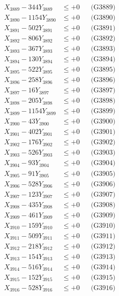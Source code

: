 \documentclass[a4paper,10pt]{article}
\begin{document}
{\begin{align}
X_{3889} - 344Y_{3889} &\leq +0 && \text{(G3889)} \\
X_{3890} - 1154Y_{3890} &\leq +0 && \text{(G3890)} \\
\allowbreak
X_{3891} - 502Y_{3891} &\leq +0 && \text{(G3891)} \\
X_{3892} - 806Y_{3892} &\leq +0 && \text{(G3892)} \\
X_{3893} - 367Y_{3893} &\leq +0 && \text{(G3893)} \\
X_{3894} - 130Y_{3894} &\leq +0 && \text{(G3894)} \\
X_{3895} - 522Y_{3895} &\leq +0 && \text{(G3895)} \\
X_{3896} - 258Y_{3896} &\leq +0 && \text{(G3896)} \\
X_{3897} - 16Y_{3897} &\leq +0 && \text{(G3897)} \\
X_{3898} - 205Y_{3898} &\leq +0 && \text{(G3898)} \\
X_{3899} - 1154Y_{3899} &\leq +0 && \text{(G3899)} \\
X_{3900} - 43Y_{3900} &\leq +0 && \text{(G3900)} \\
\allowbreak
X_{3901} - 402Y_{3901} &\leq +0 && \text{(G3901)} \\
X_{3902} - 176Y_{3902} &\leq +0 && \text{(G3902)} \\
X_{3903} - 526Y_{3903} &\leq +0 && \text{(G3903)} \\
X_{3904} - 93Y_{3904} &\leq +0 && \text{(G3904)} \\
X_{3905} - 91Y_{3905} &\leq +0 && \text{(G3905)} \\
X_{3906} - 528Y_{3906} &\leq +0 && \text{(G3906)} \\
X_{3907} - 123Y_{3907} &\leq +0 && \text{(G3907)} \\
X_{3908} - 435Y_{3908} &\leq +0 && \text{(G3908)} \\
X_{3909} - 461Y_{3909} &\leq +0 && \text{(G3909)} \\
X_{3910} - 159Y_{3910} &\leq +0 && \text{(G3910)} \\
\allowbreak
X_{3911} - 509Y_{3911} &\leq +0 && \text{(G3911)} \\
X_{3912} - 218Y_{3912} &\leq +0 && \text{(G3912)} \\
X_{3913} - 154Y_{3913} &\leq +0 && \text{(G3913)} \\
X_{3914} - 516Y_{3914} &\leq +0 && \text{(G3914)} \\
X_{3915} - 152Y_{3915} &\leq +0 && \text{(G3915)} \\
X_{3916} - 528Y_{3916} &\leq +0 && \text{(G3916)} \\

\end{align}}
\end{document}
